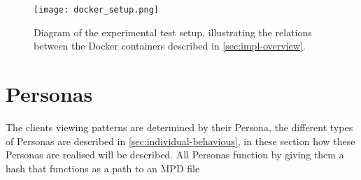 \begin{figure}[bth]
    \texttt{[image: docker\_setup.png]}
    \caption[Diagram of the experimental test setup]{Diagram of the experimental test setup, illustrating the relations between the Docker containers described in \autoref{sec:impl-overview}.}
    \label{fig:uml_docker-compose}
\end{figure}

\section{Personas}
\label{sec:impl-personas}
The clients viewing patterns are determined by their Persona, the different types of Personas are described in \autoref{sec:individual-behavious}, in these section how these Personas are realised will be described.
All Personas function by giving them a hash that functions as a path to an \ac{MPD} file
